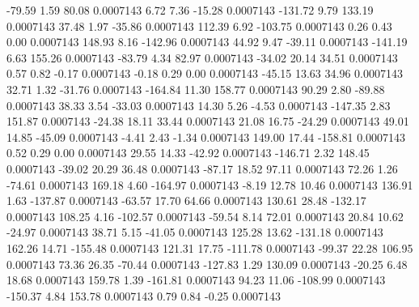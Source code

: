       -79.59        1.59       80.08     0.0007143
        6.72        7.36      -15.28     0.0007143
     -131.72        9.79      133.19     0.0007143
       37.48        1.97      -35.86     0.0007143
      112.39        6.92     -103.75     0.0007143
        0.26        0.43        0.00     0.0007143
      148.93        8.16     -142.96     0.0007143
       44.92        9.47      -39.11     0.0007143
     -141.19        6.63      155.26     0.0007143
      -83.79        4.34       82.97     0.0007143
      -34.02       20.14       34.51     0.0007143
        0.57        0.82       -0.17     0.0007143
       -0.18        0.29        0.00     0.0007143
      -45.15       13.63       34.96     0.0007143
       32.71        1.32      -31.76     0.0007143
     -164.84       11.30      158.77     0.0007143
       90.29        2.80      -89.88     0.0007143
       38.33        3.54      -33.03     0.0007143
       14.30        5.26       -4.53     0.0007143
     -147.35        2.83      151.87     0.0007143
      -24.38       18.11       33.44     0.0007143
       21.08       16.75      -24.29     0.0007143
       49.01       14.85      -45.09     0.0007143
       -4.41        2.43       -1.34     0.0007143
      149.00       17.44     -158.81     0.0007143
        0.52        0.29        0.00     0.0007143
       29.55       14.33      -42.92     0.0007143
     -146.71        2.32      148.45     0.0007143
      -39.02       20.29       36.48     0.0007143
      -87.17       18.52       97.11     0.0007143
       72.26        1.26      -74.61     0.0007143
      169.18        4.60     -164.97     0.0007143
       -8.19       12.78       10.46     0.0007143
      136.91        1.63     -137.87     0.0007143
      -63.57       17.70       64.66     0.0007143
      130.61       28.48     -132.17     0.0007143
      108.25        4.16     -102.57     0.0007143
      -59.54        8.14       72.01     0.0007143
       20.84       10.62      -24.97     0.0007143
       38.71        5.15      -41.05     0.0007143
      125.28       13.62     -131.18     0.0007143
      162.26       14.71     -155.48     0.0007143
      121.31       17.75     -111.78     0.0007143
      -99.37       22.28      106.95     0.0007143
       73.36       26.35      -70.44     0.0007143
     -127.83        1.29      130.09     0.0007143
      -20.25        6.48       18.68     0.0007143
      159.78        1.39     -161.81     0.0007143
       94.23       11.06     -108.99     0.0007143
     -150.37        4.84      153.78     0.0007143
        0.79        0.84       -0.25     0.0007143
